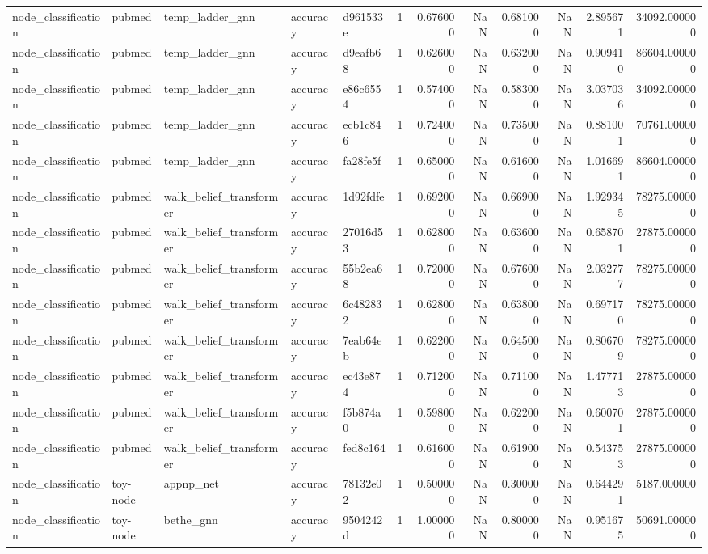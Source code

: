 \begin{tabular}{lllllrrrrrrr}
node_classification & pubmed & temp_ladder_gnn & accuracy & d961533e & 1 & 0.676000 & NaN & 0.681000 & NaN & 2.895671 & 34092.000000 \\
node_classification & pubmed & temp_ladder_gnn & accuracy & d9eafb68 & 1 & 0.626000 & NaN & 0.632000 & NaN & 0.909410 & 86604.000000 \\
node_classification & pubmed & temp_ladder_gnn & accuracy & e86c6554 & 1 & 0.574000 & NaN & 0.583000 & NaN & 3.037036 & 34092.000000 \\
node_classification & pubmed & temp_ladder_gnn & accuracy & ecb1c846 & 1 & 0.724000 & NaN & 0.735000 & NaN & 0.881001 & 70761.000000 \\
node_classification & pubmed & temp_ladder_gnn & accuracy & fa28fe5f & 1 & 0.650000 & NaN & 0.616000 & NaN & 1.016691 & 86604.000000 \\
node_classification & pubmed & walk_belief_transformer & accuracy & 1d92fdfe & 1 & 0.692000 & NaN & 0.669000 & NaN & 1.929345 & 78275.000000 \\
node_classification & pubmed & walk_belief_transformer & accuracy & 27016d53 & 1 & 0.628000 & NaN & 0.636000 & NaN & 0.658701 & 27875.000000 \\
node_classification & pubmed & walk_belief_transformer & accuracy & 55b2ea68 & 1 & 0.720000 & NaN & 0.676000 & NaN & 2.032777 & 78275.000000 \\
node_classification & pubmed & walk_belief_transformer & accuracy & 6c482832 & 1 & 0.628000 & NaN & 0.638000 & NaN & 0.697170 & 78275.000000 \\
node_classification & pubmed & walk_belief_transformer & accuracy & 7eab64eb & 1 & 0.622000 & NaN & 0.645000 & NaN & 0.806709 & 78275.000000 \\
node_classification & pubmed & walk_belief_transformer & accuracy & ec43e874 & 1 & 0.712000 & NaN & 0.711000 & NaN & 1.477713 & 27875.000000 \\
node_classification & pubmed & walk_belief_transformer & accuracy & f5b874a0 & 1 & 0.598000 & NaN & 0.622000 & NaN & 0.600701 & 27875.000000 \\
node_classification & pubmed & walk_belief_transformer & accuracy & fed8c164 & 1 & 0.616000 & NaN & 0.619000 & NaN & 0.543753 & 27875.000000 \\
node_classification & toy-node & appnp_net & accuracy & 78132e02 & 1 & 0.500000 & NaN & 0.300000 & NaN & 0.644291 & 5187.000000 \\
node_classification & toy-node & bethe_gnn & accuracy & 9504242d & 1 & 1.000000 & NaN & 0.800000 & NaN & 0.951675 & 50691.000000 \\

\end{tabular}
